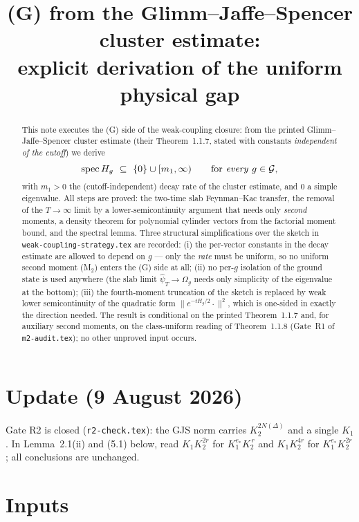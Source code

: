 \documentclass[11pt,a4paper]{article}
\title{(G) from the Glimm--Jaffe--Spencer cluster estimate:\\ explicit derivation of the uniform physical gap}
\author{}
\date{}
\theoremstyle{plain}
\theoremstyle{definition}
\newcommand{\Om}{\Omega}
\newcommand{\G}{\mathcal{G}}
\DeclareMathOperator{\spec}{spec}
\begin{document}
\maketitle

\section*{Update (9 August 2026)}
Gate R2 is closed (\texttt{r2-check.tex}): the GJS norm carries $K_2^{2N(\Delta)}$ and a single $K_1$. In Lemma~2.1(ii) and (5.1) below, read $K_1K_2^{2r}$ for $K_1^{e_*}K_2^{\,r}$ and $K_1K_2^{4r}$ for $K_1^{e_*}K_2^{2r}$; all conclusions are unchanged.


\begin{abstract}
This note executes the (G) side of the weak-coupling closure: from the printed
Glimm--Jaffe--Spencer cluster estimate (their Theorem~1.1.7, stated with constants
\emph{independent of the cutoff}) we derive
\[
  \spec H_g\ \subseteq\ \{0\}\cup[m_1,\infty)
  \qquad\text{for \emph{every} } g\in\G,
\]
with $m_1>0$ the (cutoff-independent) decay rate of the cluster estimate, and $0$ a simple
eigenvalue. All steps are proved: the two-time slab Feynman--Kac transfer, the removal of the
$T\to\infty$ limit by a lower-semicontinuity argument that needs only \emph{second} moments, a
density theorem for polynomial cylinder vectors from the factorial moment bound, and the spectral
lemma. Three structural simplifications over the sketch in
\texttt{weak-coupling-strategy.tex} are recorded: (i) the per-vector constants in the decay
estimate are allowed to depend on $g$ --- only the \emph{rate} must be uniform, so no uniform
second moment (M$_2$) enters the (G) side at all; (ii) no per-$g$ isolation of the ground state is
used anywhere (the slab limit $\hat\psi_T\to\Om_g$ needs only simplicity of the eigenvalue at the
bottom); (iii) the fourth-moment truncation of the sketch is replaced by weak lower
semicontinuity of the quadratic form $\|e^{-tH_g/2}\cdot\|^2$, which is one-sided in exactly the
direction needed. The result is conditional on the printed Theorem~1.1.7 and, for auxiliary
second moments, on the class-uniform reading of Theorem~1.1.8 (Gate~R1 of
\texttt{m2-audit.tex}); no other unproved input occurs.
\end{abstract}

\section{Inputs}\label{sec:inputs}
\end{document}
